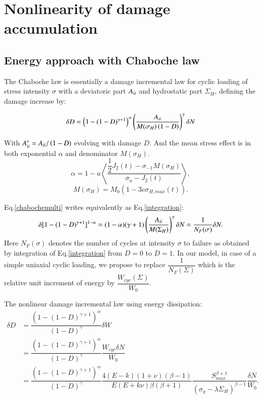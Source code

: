 \documentclass[3p,times,number,review]{elsarticle}
\begin{document}
\section{Nonlinearity of damage accumulation}
\subsection{Energy approach with Chaboche law}
The Chaboche law\cite{lemaitre1990mechanics} is essentially a damage incremental law for cyclic loading of stress intensity $\sigma$ with a deviatoric part ${A}_{\uppercase\expandafter{\romannumeral2}}$ and hydrostatic part $\Sigma_H$, defining the damage increase by:

 \begin{equation}\delta D = \left( 1 -(1-D)^{\gamma+1}\right)^\alpha \left(\frac{{A}_{\uppercase\expandafter{\romannumeral2}} }{M(\sigma_H)\left( 1-D\right)}\right)^\gamma \delta N
 \label{chabochemulti}
 \end{equation} 
 
With ${A}_{\uppercase\expandafter{\romannumeral2}}^*={A}_{\uppercase\expandafter{\romannumeral2}}/\left( 1-D\right) $ evolving with damage $D$. And the mean stress effect is in both exponential $\alpha$ and denominator $M(\sigma_H)$.
$$\alpha=1 - a\left\langle \dfrac{\dfrac{1}{2}J_2(t)-\sigma_{-1}M(\sigma_H) }{\sigma_{u} -J_2(t)}\right\rangle,$$
$$M(\sigma_H) =M_0 \left(1-3c\sigma_{H,max}(t) \right).$$
 
Eq.\eqref{chabochemulti} writes equivalently as Eq.\eqref{integration}:
   \begin{equation}\delta [1-(1-D)^{\gamma+1}]^{1-\alpha}=(1-\alpha)(\gamma+1)\left(\dfrac{{A}_{\uppercase\expandafter{\romannumeral2}} }{M(\Sigma_H)}\right)^\gamma \delta N=\dfrac{1}{N_F(\sigma)}\delta N.
   \label{integration}
   \end{equation}
Here $N_F(\sigma)$ denotes the number of cycles at intensity $\sigma$ to failure as obtained by integration of Eq.\eqref{integration} from $D=0$ to $D=1$. In our model, in case of a simple uniaxial cyclic loading, we propose to replace $\dfrac{1}{N_F(\Sigma)}$ which is the relative unit increment of energy by $\dfrac{W_{cyc}(\Sigma)}{W_0}$.



The nonlinear damage incremental law using energy dissipation:
\begin{equation}
\begin{split}
  \delta D &=\dfrac{\left( 1 -(1-D)^{\gamma+1}\right)^\alpha}{\left(1-D \right)^\gamma} \delta W
  \\&= \dfrac{\left( 1 -(1-D)^{\gamma+1}\right)^\alpha}{\left(1-D \right)^\gamma} \dfrac{W_{cyc}\delta N}{W_0}
  \\&= \dfrac{\left( 1 -(1-D)^{\gamma+1}\right)^\alpha}{\left(1-D \right)^\gamma} \dfrac{4(E-k)(1+\nu)\left( \beta-1\right) }{ E(E+k\nu)\beta\left( \beta+1\right) }\dfrac{S_{max}^{\beta+1}}{\left(\sigma_y-\lambda \Sigma_H\right)^{\beta-1}}\dfrac{\delta N}{W_0}.
\end{split}
\label{recoverchaboche}
\end{equation} 
\end{document}
